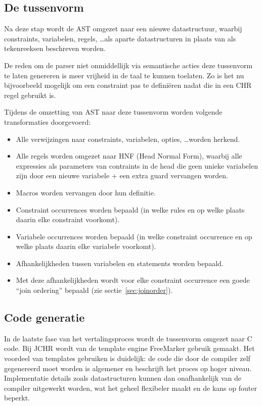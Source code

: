 \subsection{De tussenvorm} \label{sec:tussenvorm}

Na deze stap wordt de AST omgezet naar een nieuwe datastructuur, waarbij constraints, variabelen, regels, \ldots als aparte datastructuren in plaats van als tekenreeksen beschreven worden. 

De reden om de parser niet onmiddellijk via semantische acties deze tussenvorm te laten genereren is meer vrijheid in de taal te kunnen toelaten. Zo is het nu bijvoorbeeld mogelijk om een constraint pas te defini\"eren nadat die in een CHR regel gebruikt is.

Tijdens de omzetting van AST naar deze tussenvorm worden volgende transformaties doorgevoerd: \begin{itemize}
\item Alle verwijzingen naar constraints, variabelen, opties, \ldots worden herkend.
\item Alle regels worden omgezet naar HNF (Head Normal Form), waarbij alle expressies als parameters van contraints in de head die geen unieke variabelen zijn door een nieuwe variabele + een extra guard vervangen worden.
\item Macros worden vervangen door hun definitie.
\item Constraint occurrences worden bepaald (in welke rules en op welke plaats daarin elke constraint voorkomt).
\item Variabele occurrences worden bepaald (in welke constraint occurrence en op welke plaats daarin elke variabele voorkomt).
\item Afhankelijkheden tussen variabelen en statements worden bepaald.
\item Met deze afhankelijkheden wordt voor elke constraint occurrence een goede ``join ordering'' bepaald (zie sectie~\ref{sec:joinorder}).
\end{itemize}

\subsection{Code generatie} \label{sec:codegen}

In de laatste fase van het vertalingsproces wordt de tussenvorm omgezet naar C code. Bij JCHR wordt van de template engine FreeMarker gebruik gemaakt. Het voordeel van templates gebruiken is duidelijk: de code die door de compiler zelf gegenereerd moet worden is algemener en beschrijft het proces op hoger niveau. Implementatie details zoals datastructuren kunnen dan onafhankelijk van de compiler uitgewerkt worden, wat het geheel flexibeler maakt en de kans op fouter beperkt.

